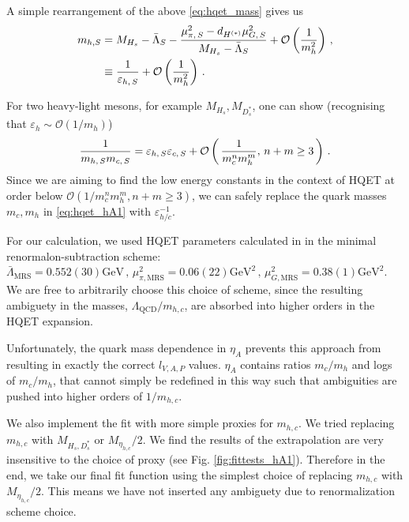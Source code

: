 A simple rearrangement of the above \eqref{eq:hqet_mass} gives us
\begin{align}
  \label{eq:epsilon_h}
  m_{h,S} &= M_{H_s} - \bar{\Lambda}_S - { \mu^2_{\pi,\,S} - d_{H^{(*)}} \mu^2_{G,\,S} \over M_{H_s} - \bar{\Lambda}_S} + \mathcal{O}\left({1\over m_h^2}\right)\,, \\ \nonumber
  & \equiv {1\over\varepsilon_{h,\,S}} + \mathcal{O}\left({1\over m_h^2}\right)\,.
\end{align}

For two heavy-light mesons, for example $M_{H_s},M_{D_s^*}$, one can show (recognising that $\varepsilon_{h}\sim \mathcal{O}(1/m_h)$)
\begin{align}
  {1\over m_{h,\,S} m_{c,\,S}} = \varepsilon_{h,\,S}\varepsilon_{c,\,S} + \mathcal{O}\left( \, {1\over m_c^n m_h^m}, \, n+m\geq 3 \, \right)\,.
\end{align}
Since we are aiming to find the low energy constants in the context of HQET at order below $\mathcal{O}( 1/ m_c^n m_h^m, n+m\geq 3 )$, we can safely replace the quark masses $m_c,m_h$ in \eqref{eq:hqet_hA1} with $\varepsilon_{h/c}^{-1}$.

For our calculation, we used HQET parameters calculated in \cite{Bazavov:2018omf} in the minimal renormalon-subtraction scheme: $\bar{\Lambda}_{\text{MRS}} = 0.552(30)\text{GeV} \,,\, \mu^2_{\pi,\text{MRS}} = 0.06(22)\text{GeV}^2 \,, \, \mu^2_{G,\text{MRS}} = 0.38(1)\text{GeV}^2$. We are free to arbitrarily choose this choice of scheme, since the resulting ambiguety in the masses, $\Lambda_{\text{QCD}}/m_{h,c}$, are absorbed into higher orders in the HQET expansion.

Unfortunately, the quark mass dependence in $\eta_A$ prevents this approach from resulting in exactly the correct $l_{V,A,P}$ values. $\eta_A$ contains ratios $m_c/m_h$ and logs of $m_c/m_h$, that cannot simply be redefined in this way such that ambiguities are pushed into higher orders of $1/m_{h,c}$.

We also implement the fit with more simple proxies for $m_{h,c}$. We tried replacing $m_{h,c}$ with $M_{H_s,D^*_s}$ or $M_{\eta_{h,c}}/2$. We find the results of the extrapolation are very insensitive to the choice of proxy (see Fig. \ref{fig:fittests_hA1}). Therefore in the end, we take our final fit function using the simplest choice of replacing $m_{h,c}$ with $M_{\eta_{h,c}}/2$. This means we have not inserted any ambiguety due to renormalization scheme choice.


